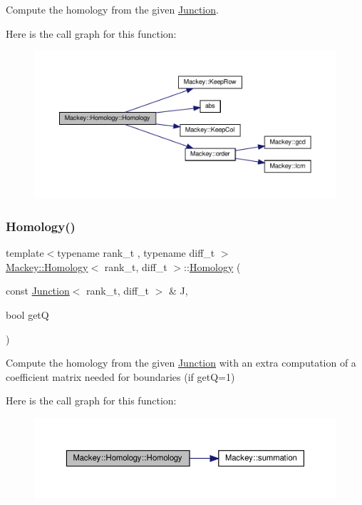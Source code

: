Compute the homology from the given \hyperlink{classMackey_1_1Junction}{Junction}. 

Here is the call graph for this function\+:\nopagebreak
\begin{figure}[H]
\begin{center}
\leavevmode
\includegraphics[width=350pt]{classMackey_1_1Homology_a31e26f0fb8e1cd7f0506ae1dbc97ea22_cgraph}
\end{center}
\end{figure}
\mbox{\label{classMackey_1_1Homology_af42f480509ef68df47308c0f506d44c8}} 
\subsubsection{\texorpdfstring{Homology()}{Homology()}\hspace{0.1cm}{\footnotesize\ttfamily [3/3]}}
{\footnotesize\ttfamily template$<$typename rank\+\_\+t , typename diff\+\_\+t $>$ \\
\hyperlink{classMackey_1_1Homology}{Mackey\+::\+Homology}$<$ rank\+\_\+t, diff\+\_\+t $>$\+::\hyperlink{classMackey_1_1Homology}{Homology} (\begin{DoxyParamCaption}\item[{const \hyperlink{classMackey_1_1Junction}{Junction}$<$ rank\+\_\+t, diff\+\_\+t $>$ \&}]{J,  }\item[{bool}]{getQ }\end{DoxyParamCaption})}



Compute the homology from the given \hyperlink{classMackey_1_1Junction}{Junction} with an extra computation of a coefficient matrix needed for boundaries (if getQ=1) 

Here is the call graph for this function\+:\nopagebreak
\begin{figure}[H]
\begin{center}
\leavevmode
\includegraphics[width=350pt]{classMackey_1_1Homology_af42f480509ef68df47308c0f506d44c8_cgraph}
\end{center}
\end{figure}


